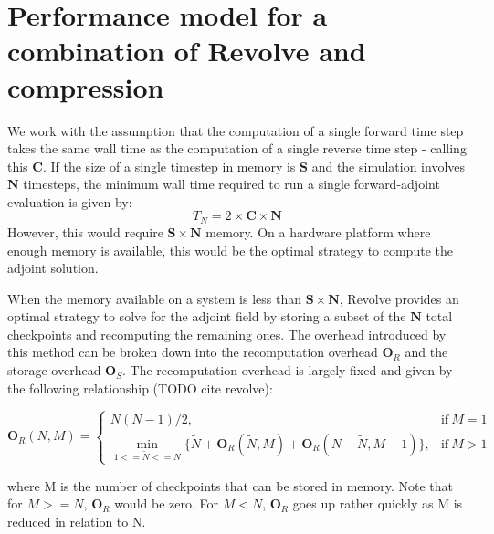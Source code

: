 \documentclass[conference]{IEEEtran}
\begin{document}
\section{Performance model for a combination of Revolve and compression}
We work with the assumption that the computation of a single forward time step takes the same wall time
as the computation of a single reverse time step - calling this $\mathbf{C}$. If the size of a single 
timestep in memory is $\mathbf{S}$ and the simulation involves $\mathbf{N}$ timesteps, the minimum
wall time required to run a single forward-adjoint evaluation is given by:
\begin{equation}
T_N = 2 \times \mathbf{C} \times \mathbf{N}
\end{equation}
However, this would require $\mathbf{S} \times \mathbf{N}$ memory. On a hardware platform where enough memory
is available, this would be the optimal strategy to compute the adjoint solution. 

When the memory available on a system is less than $\mathbf{S} \times \mathbf{N}$, Revolve provides
an optimal strategy to solve for the adjoint field by storing a subset of the $\mathbf{N}$ total checkpoints
and recomputing the remaining ones. The overhead introduced by this method can be broken down into
the recomputation overhead $\mathbf{O}_R$ and the storage overhead $\mathbf{O}_S$. The recomputation
overhead is largely fixed and given by the following relationship (TODO cite revolve):
\begin{strip}
\begin{equation}
\mathbf{O}_R(N, M) = \begin{cases}
      N(N-1) /2, & \text{if}\ M=1 \\
      \min\limits_{1<=\widetilde{N}<=N} \{\widetilde{N} + \mathbf{O}_R(\widetilde{N}, M) + \mathbf{O}_R(N-\widetilde{N}, M-1)\}, & \text{if}\ M>1
    \end{cases}
    \label{eqn:recompute}
\end{equation}
\end{strip}
where M is the number of checkpoints that can be stored in memory. Note that for $M >=N$, $\mathbf{O}_R$
would be zero. For $M < N$, $\mathbf{O}_R$ goes up rather quickly as M is reduced in relation to N. 
\end{document}
